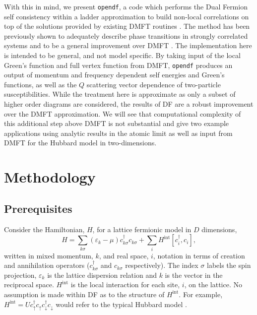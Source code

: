 \documentclass[3p,times,procedia]{elsarticle}
\begin{document}
With this in mind, we present \texttt{opendf}, a code which performs the Dual Fermion self consistency within a ladder approximation to build non-local correlations on top of the solutions provided by existing DMFT routines \cite{Rubtsov2008,HafermannLi:2009}. The method has been previously shown to adequately describe phase transitions in strongly correlated systems and to be a general improvement over DMFT \cite{HafermannLi:2009,Antipov2014,Li2014}. The implementation here is intended to be general, and not model specific. By taking input of the local Green's function and full vertex function from DMFT, \texttt{opendf} produces an output of momentum and frequency dependent self energies and Green's functions, as well as the $Q$ scattering vector dependence of two-particle susceptibilities.  While the treatment here is approximate as only a subset of higher order diagrams are considered, the results of DF are a robust improvement over the DMFT approximation.  We will see that computational complexity of this additional step above DMFT is not substantial and give two example applications using analytic results in the atomic limit as well as input from DMFT for the Hubbard model in two-dimensions.

\section{Methodology}
\subsection{Prerequisites}
Consider the Hamiltonian, $H$, for a lattice fermionic model in $D$ dimensions,
\begin{equation}
H = \sum_{k\sigma} (\varepsilon_k - \mu) c^\dagger_{k\sigma} c_{k\sigma} + \sum_i H^{\mathrm{int}} [c^\dagger_i, c_i],
\end{equation}
written in mixed momentum, $k$, and real space, $i$, notation in terms of creation and annihilation operators ($c^\dagger_{k\sigma}$ and $c_{k\sigma}$ respectively).  The index $\sigma$ labels the spin projection, $\varepsilon_k$ is the lattice dispersion relation and $k$ is the vector in the reciprocal space. 
$H^{\mathrm{int}}$ is the local interaction for each site, $i$, on the lattice. 
No assumption is made within DF as to the structure of $H^{\mathrm{int}}$.  For example, $H^{\mathrm{int}} = U c^\dagger_\uparrow c_\uparrow c^\dagger_\downarrow c_\downarrow$ would refer to the typical Hubbard model \cite{Hubbard1963}. 
\end{document}
